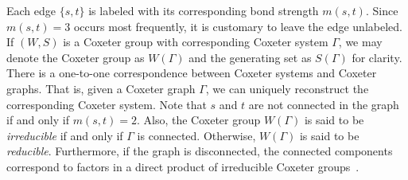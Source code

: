 Each edge $\{s, t\}$ is labeled with its corresponding bond strength $m(s,t)$. Since $m(s,t)=3$ occurs most frequently, it is customary to leave the edge unlabeled. If $(W,S)$ is a Coxeter group with corresponding Coxeter system $\Gamma$, we may denote the Coxeter group as $W(\Gamma)$ and the generating set as $S(\Gamma)$ for clarity. There is a one-to-one correspondence between Coxeter systems and Coxeter graphs. That is, given a Coxeter graph $\Gamma$, we can uniquely reconstruct the corresponding Coxeter system. Note that $s$ and $t$ are not connected in the graph if and only if $m(s,t)=2$. Also, the Coxeter group $W(\Gamma)$ is said to be \emph{irreducible} if and only if $\Gamma$ is connected. Otherwise, $W(\Gamma)$ is said to be \emph{reducible}. Furthermore, if the graph is disconnected, the connected components correspond to factors in a direct product of irreducible Coxeter groups~\cite{Humphreys1990}.

